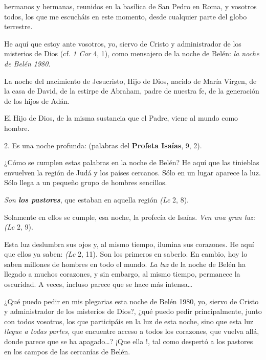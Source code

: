 \begin{body}
	 hermanos y hermanas, reunidos en la basílica de San Pedro en Roma, y vosotros todos, los que me escucháis en este momento, desde cualquier parte del globo terrestre.
	
	He aquí que estoy ante vosotros, yo, siervo de Cristo y administrador de los misterios de Dios (cf. \emph{1 Cor} 4, 1), como mensajero de la noche de Belén: \emph{la noche de Belén 1980}.
	
	La noche del nacimiento de Jesucristo, Hijo de Dios, nacido de María Virgen, de la casa de David, de la estirpe de Abraham, padre de nuestra fe, de la generación de los hijos de Adán.
	
	El Hijo de Dios, de la misma sustancia que el Padre, viene al mundo como hombre.
	
	2. Es una noche profunda:  (palabras del \textbf{Profeta Isaías}, 9, 2).
	
	¿Cómo se cumplen estas palabras en la noche de Belén? He aquí que las tinieblas envuelven la región de Judá y los países cercanos. Sólo en un lugar aparece la luz. Sólo llega a un pequeño grupo de hombres sencillos.
	
	\emph{Son \textbf{los pastores}}, que estaban en aquella región  \emph{(Lc} 2, 8).
	
	Solamente en ellos se cumple, esa noche, la profecía de Isaías. \emph{Ven una gran luz:}  \emph{(Lc} 2, 9).
	
	Esta luz deslumbra sus ojos y, al mismo tiempo, ilumina sus corazones. He aquí que ellos ya saben:  \emph{(Lc} 2, 11). Son los primeros en saberlo. En cambio, hoy lo saben millones de hombres en todo el mundo. \emph{La luz} de la noche de Belén ha llegado a muchos corazones, y sin embargo, al mismo tiempo, permanece la oscuridad. A veces, incluso parece que se hace más intensa\ldots{}
	
	¿Qué puedo pedir en mis plegarias esta noche de Belén 1980, yo, siervo de Cristo y administrador de los misterios de Dios?, ¿qué puedo pedir principalmente, junto con todos vosotros, los que participáis en la luz de esta noche, sino que esta luz \emph{llegue a todas partes,} que encuentre acceso a todos los corazones, que vuelva allá, donde parece que se ha apagado\ldots{}? ¡Que ella !, tal como despertó a los pastores en los campos de las cercanías de Belén.
	

\end{body}
